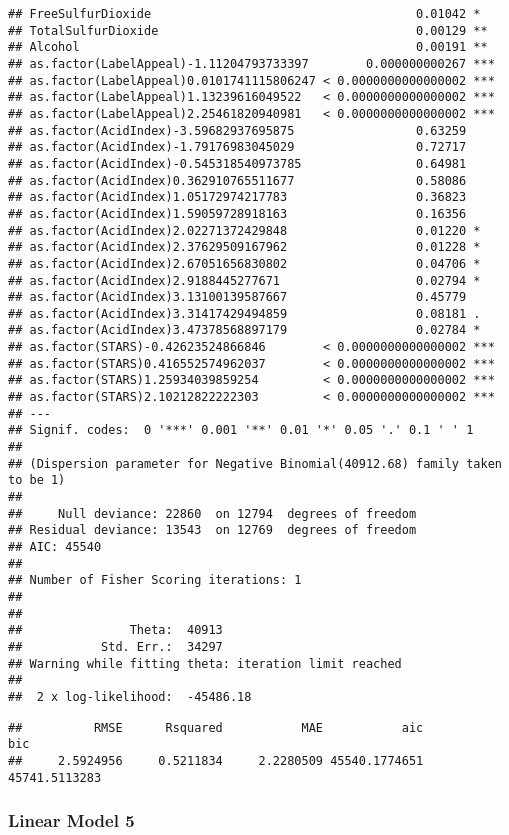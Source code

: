 \documentclass[
]{article}
\begin{document}
\begin{verbatim}
## FreeSulfurDioxide                                     0.01042 *  
## TotalSulfurDioxide                                    0.00129 ** 
## Alcohol                                               0.00191 ** 
## as.factor(LabelAppeal)-1.11204793733397        0.000000000267 ***
## as.factor(LabelAppeal)0.0101741115806247 < 0.0000000000000002 ***
## as.factor(LabelAppeal)1.13239616049522   < 0.0000000000000002 ***
## as.factor(LabelAppeal)2.25461820940981   < 0.0000000000000002 ***
## as.factor(AcidIndex)-3.59682937695875                 0.63259    
## as.factor(AcidIndex)-1.79176983045029                 0.72717    
## as.factor(AcidIndex)-0.545318540973785                0.64981    
## as.factor(AcidIndex)0.362910765511677                 0.58086    
## as.factor(AcidIndex)1.05172974217783                  0.36823    
## as.factor(AcidIndex)1.59059728918163                  0.16356    
## as.factor(AcidIndex)2.02271372429848                  0.01220 *  
## as.factor(AcidIndex)2.37629509167962                  0.01228 *  
## as.factor(AcidIndex)2.67051656830802                  0.04706 *  
## as.factor(AcidIndex)2.9188445277671                   0.02794 *  
## as.factor(AcidIndex)3.13100139587667                  0.45779    
## as.factor(AcidIndex)3.31417429494859                  0.08181 .  
## as.factor(AcidIndex)3.47378568897179                  0.02784 *  
## as.factor(STARS)-0.42623524866846        < 0.0000000000000002 ***
## as.factor(STARS)0.416552574962037        < 0.0000000000000002 ***
## as.factor(STARS)1.25934039859254         < 0.0000000000000002 ***
## as.factor(STARS)2.10212822222303         < 0.0000000000000002 ***
## ---
## Signif. codes:  0 '***' 0.001 '**' 0.01 '*' 0.05 '.' 0.1 ' ' 1
## 
## (Dispersion parameter for Negative Binomial(40912.68) family taken to be 1)
## 
##     Null deviance: 22860  on 12794  degrees of freedom
## Residual deviance: 13543  on 12769  degrees of freedom
## AIC: 45540
## 
## Number of Fisher Scoring iterations: 1
## 
## 
##               Theta:  40913 
##           Std. Err.:  34297 
## Warning while fitting theta: iteration limit reached 
## 
##  2 x log-likelihood:  -45486.18
\end{verbatim}

\begin{verbatim}
##          RMSE      Rsquared           MAE           aic           bic 
##     2.5924956     0.5211834     2.2280509 45540.1774651 45741.5113283
\end{verbatim}

\hypertarget{linear-model-5}{%
\subsubsection{Linear Model 5}\label{linear-model-5}}
\end{document}
